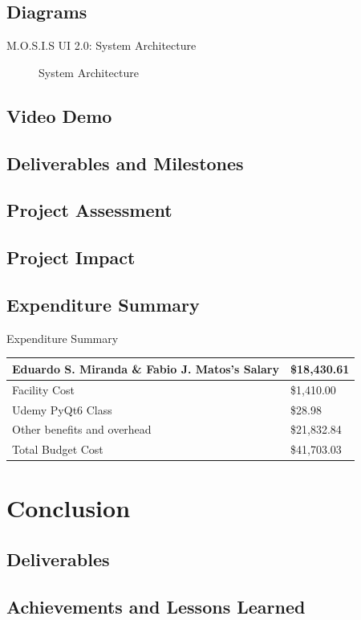 \documentclass[17pt, aspectratio=169]{beamer}
\begin{document}
\subsection*{Diagrams}\begin{frame}{M.O.S.I.S UI 2.0: System Architecture}
	\begin{figure}
		\caption{System Architecture}
	\end{figure}
\end{frame}
\subsection{Video Demo}
\subsection*{Deliverables and Milestones}
\subsection{Project Assessment}
\subsection*{Project Impact}
\subsection*{Expenditure Summary}
\begin{frame}{Expenditure Summary}
	\begin{center}
		\begin{tabular}{||m{} | m{} ||}
			\hline
			Eduardo S. Miranda \& Fabio J. Matos's Salary & \$18,430.61 \\
			\hline
			Facility Cost                                 & \$1,410.00  \\
			\hline
			Udemy PyQt6 Class                             & \$28.98     \\
			\hline
			Other benefits and overhead                   & \$21,832.84 \\
			\hline
			Total Budget Cost                             & \$41,703.03 \\
			\hline
		\end{tabular}
	\end{center}
\end{frame}
\section{Conclusion}
\subsection{Deliverables}
\subsection{Achievements and Lessons Learned}
\end{document}
